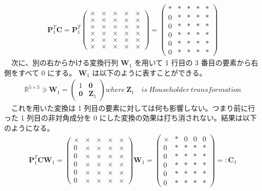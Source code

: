 \documentclass[a4paper,10pt]{jarticle}
\begin{document}
\begin{align*}
\bm{P}^T_1 \bm{C} = \bm{P}^T_1
\begin{pmatrix}
\times & \times & \times & \times & \times \\
\times & \times & \times & \times & \times \\
\times & \times & \times & \times & \times \\
\times & \times & \times & \times & \times \\
\times & \times & \times & \times & \times \\
\times & \times & \times & \times & \times
\end{pmatrix}
=
\begin{pmatrix}
\ast & \ast & \ast & \ast & \ast \\
0 & \ast & \ast & \ast & \ast \\
0 & \ast & \ast & \ast & \ast \\
0 & \ast & \ast & \ast & \ast \\
0 & \ast & \ast & \ast & \ast \\
0 & \ast & \ast & \ast & \ast 
\end{pmatrix}
\end{align*}
　次に、別の右からかける変換行列 \(\bm{W}_1\) を用いて 1 行目の 3 番目の要素から右側をすべて 0 にする。 \(\bm{W}_1\) は以下のように表すことができる。\\
\begin{align*}
\mathbb{R}^{5\times5} \ni \bm{W}_1 = 
\begin{pmatrix}
1 & \bm{0} \\
\bm{0} & \bm{Z}_1 
\end{pmatrix}
where\ \bm{Z}_1\ &is\ Householder\ transformation
\end{align*}
　これを用いた変換は 1 列目の要素に対しては何も影響しない。つまり前に行った 1 列目の非対角成分を 0 にした変換の効果は打ち消されない。結果は以下のようになる。\\
\begin{align*}
\bm{P}^T_1\bm{C}\bm{W}_1 =
\begin{pmatrix}
\times & \times & \times & \times & \times \\
0 & \times & \times & \times & \times \\
0 & \times & \times & \times & \times \\
0 & \times & \times & \times &  \times \\
0 & \times & \times & \times &  \times \\
0 & \times & \times & \times &  \times
\end{pmatrix}
\bm{W}_1
=
\begin{pmatrix}
\times & \ast & 0 & 0 & 0 \\
0 & \ast & \ast & \ast & \ast \\
0 & \ast & \ast & \ast & \ast \\
0 & \ast & \ast & \ast &  \ast \\
0 & \ast & \ast & \ast &  \ast \\
0 & \ast & \ast & \ast &  \ast
\end{pmatrix}
=: \bm{C}_1
\end{align*}
\end{document}
